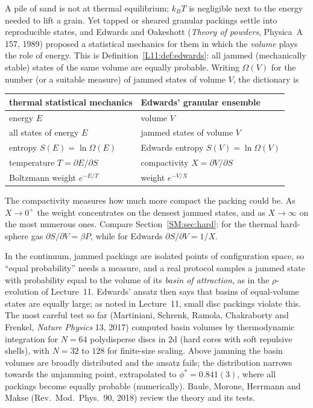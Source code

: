 \documentclass[11pt,openany]{book}
\theoremstyle{plain}
\theoremstyle{definition}
\theoremstyle{remark}
\begin{document}
A pile of sand is not at thermal equilibrium; $k_BT$ is negligible next to the energy needed to lift a
grain. Yet tapped or sheared granular packings settle into reproducible states, and Edwards and
Oakeshott (\emph{Theory of powders}, Physica~A 157, 1989) proposed a statistical mechanics for them in
which the \emph{volume} plays the role of energy. This is Definition~\ref{L11:def:edwards}: all jammed
(mechanically stable) states of the same volume are equally probable. Writing $\Omega(V)$ for the number
(or a suitable measure) of jammed states of volume $V$, the dictionary is
\begin{center}
\renewcommand{\arraystretch}{1.2}
\begin{tabular}{ll}
\toprule
thermal statistical mechanics & Edwards' granular ensemble\\
\midrule
energy $E$ & volume $V$\\
all states of energy $E$ & jammed states of volume $V$\\
entropy $S(E)=\ln\Omega(E)$ & Edwards entropy $S(V)=\ln\Omega(V)$\\
temperature $T=\partial E/\partial S$ & compactivity $X=\partial V/\partial S$\\
Boltzmann weight $e^{-E/T}$ & weight $e^{-V/X}$\\
\bottomrule
\end{tabular}
\end{center}
The compactivity measures how much more compact the packing could be. As $X\to0^+$ the weight
concentrates on the densest jammed states, and as $X\to\infty$ on the most numerous ones. Compare
Section~\ref{SM:sec:hard}: for the thermal hard-sphere gas $\partial S/\partial V=\beta P$, while for
Edwards $\partial S/\partial V=1/X$.

In the continuum, jammed packings are isolated points of configuration space, so ``equal
probability'' needs a measure, and a real protocol samples a jammed state with probability equal to the
volume of its \emph{basin of attraction}, as in the $\rho$-evolution of Lecture~11. Edwards' ansatz then
says that basins of equal-volume states are equally large; as noted in Lecture~11, small disc packings
violate this. The most careful test so far (Martiniani, Schrenk, Ramola, Chakraborty and Frenkel,
\emph{Nature Physics} 13, 2017) computed basin volumes by thermodynamic integration for $N=64$
polydisperse discs in $2$d (hard cores with soft repulsive shells), with $N=32$ to $128$ for finite-size
scaling. Above jamming the basin volumes are broadly distributed and the ansatz fails; the distribution
narrows towards the unjamming point, extrapolated to $\phi^*=0.841(3)$, where all packings become
equally probable (numerically). Baule, Morone, Herrmann and Makse (Rev.\ Mod.\ Phys.\ 90, 2018) review
the theory and its tests.
\end{document}
